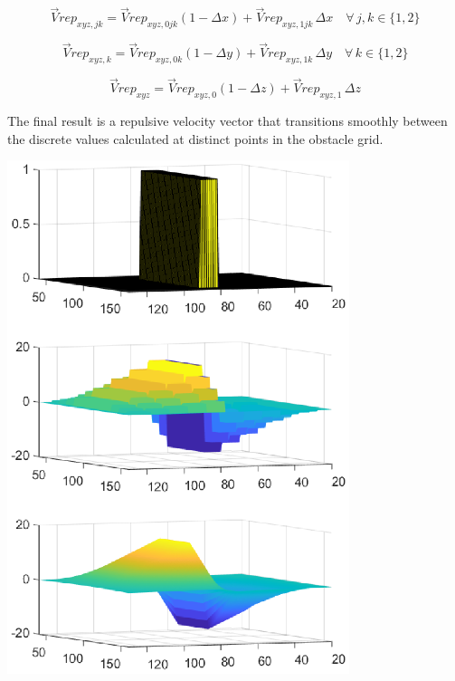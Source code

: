 \documentclass[]{article}
\begin{document}
\begin{equation}
	\label{eq: interp x}
	\vec{V}rep_{xyz,jk} = \vec{V}rep_{xyz,0jk}(1 - \Delta x) + \vec{V}rep_{xyz,1jk} \, \Delta x \quad \forall \, j, k \in \{1, 2\}
\end{equation}

%

\begin{equation}
	\label{eq: interp y}
	\vec{V}rep_{xyz,k} = \vec{V}rep_{xyz,0k}(1 - \Delta y) + \vec{V}rep_{xyz,1k} \, \Delta y \quad \forall \, k \in \{1, 2\}
\end{equation}

\begin{equation}
	\label{eq: interp z}
	\vec{V}rep_{xyz} = \vec{V}rep_{xyz,0}(1 - \Delta z) + \vec{V}rep_{xyz,1} \, \Delta z 
\end{equation}

The final result is a repulsive velocity vector that transitions smoothly between the discrete values calculated at distinct points in the obstacle grid.


\includegraphics[width=0.75\textwidth]{field3D_visualization-3figures.eps}
\end{document}
